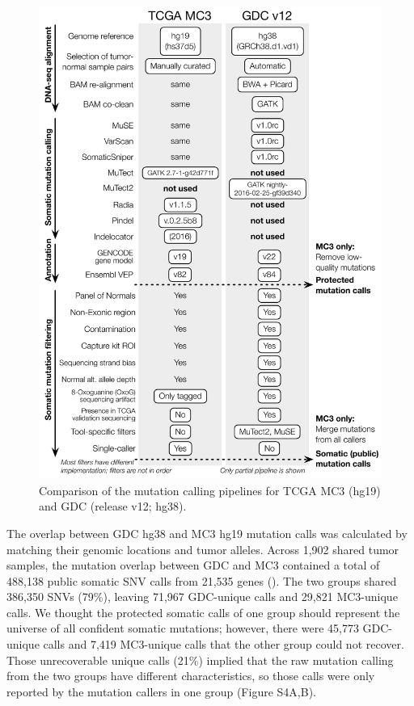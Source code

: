 \begin{figure}[tbp]
    \centering
    \includegraphics[height=0.9\textheight]{figures/chap02_mutation_pipeline_qc/mutation pipeline difference.pdf}
    \caption{Comparison of the mutation calling pipelines for TCGA MC3 (hg19) and GDC (release v12; hg38).}
    \label{fig:mut-call-qc-pipeline-comparison}
\end{figure}

The overlap between GDC hg38 and MC3 hg19 mutation calls was calculated by matching their genomic locations and tumor alleles. Across 1,902 shared tumor samples, the mutation overlap between GDC and MC3 contained a total of 488,138 public somatic SNV calls from 21,535 genes (). The two groups shared 386,350 SNVs (79\%), leaving 71,967 GDC-unique calls and 29,821 MC3-unique calls. We thought the protected somatic calls of one group should represent the universe of all confident somatic mutations; however, there were 45,773 GDC-unique calls and 7,419 MC3-unique calls that the other group could not recover. Those unrecoverable unique calls (21\%) implied that the raw mutation calling from the two groups have different characteristics, so those calls were only reported by the mutation callers in one group (Figure S4A,B).

